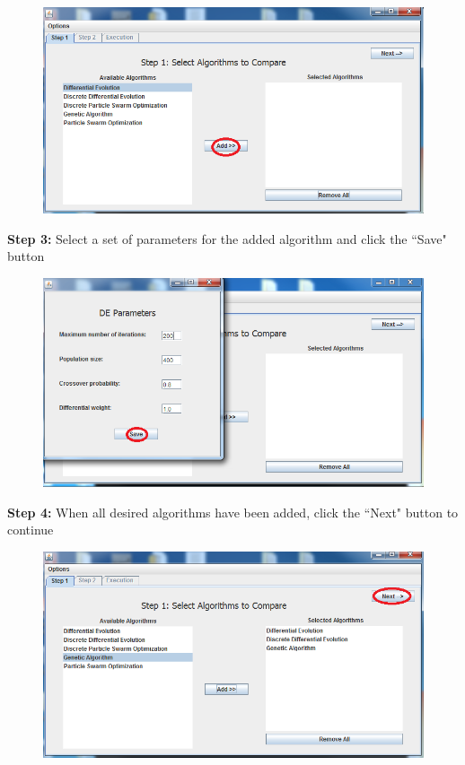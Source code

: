 \documentclass[titlepage]{article}
\begin{document}
\begin{figure}[H]
\centering
\includegraphics[width=150mm]{Images/guiSteps/step2.png}
\end{figure}

\textbf{Step 3:} Select a set of parameters for the added algorithm and click the ``Save" button

\begin{figure}[H]
\centering
\includegraphics[width=160mm]{Images/guiSteps/step3.png}
\end{figure}

\textbf{Step 4:} When all desired algorithms have been added, click the ``Next" button to continue

\begin{figure}[H]
\centering
\includegraphics[width=150mm]{Images/guiSteps/step4.png}
\end{figure}
\end{document}

